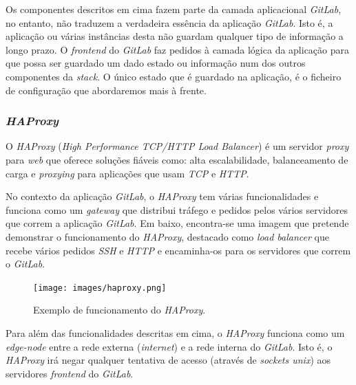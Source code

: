 \documentclass[12pt,a4paper]{article}
\begin{document}
Os componentes descritos em cima fazem parte da camada aplicacional \emph{GitLab}, no entanto, não traduzem a verdadeira essência da aplicação \emph{GitLab}. Isto é, a aplicação ou várias instâncias desta não guardam qualquer tipo de informação a longo prazo. O \emph{frontend} do \emph{GitLab} faz pedidos à camada lógica da aplicação para que possa ser guardado um dado estado ou informação num dos outros componentes da \emph{stack}. O único estado que é guardado na aplicação, é o ficheiro de configuração que abordaremos mais à frente.

\subsubsection{\emph{HAProxy}}


O \emph{HAProxy} (\emph{High Performance TCP/HTTP Load Balancer}) é um servidor \emph{proxy} para \emph{web} que oferece soluções fiáveis como: alta escalabilidade, balanceamento de carga e \emph{proxying} para aplicações que usam \emph{TCP} e \emph{HTTP}.

No contexto da aplicação \emph{GitLab}, o \emph{HAProxy} tem várias funcionalidades e funciona como um \emph{gateway} que distribui tráfego e pedidos pelos vários servidores que correm a aplicação \emph{GitLab}. Em baixo, encontra-se uma imagem que pretende demonstrar o funcionamento do \emph{HAProxy}, destacado como \emph{load balancer} que recebe vários pedidos \emph{SSH} e \emph{HTTP} e encaminha-os para os servidores que correm o \emph{GitLab}.

\begin{figure}[H]
  \centering
  \texttt{[image: images/haproxy.png]}
  \caption{Exemplo de funcionamento do \emph{HAProxy}.}
\end{figure}

Para além das funcionalidades descritas em cima, o \emph{HAProxy} funciona como um \emph{edge-node} entre a rede externa (\emph{internet}) e a rede interna do \emph{GitLab}. Isto é, o \emph{HAProxy} irá negar qualquer tentativa de acesso (através de \emph{sockets unix}) aos servidores \emph{frontend} do \emph{GitLab}.

\end{document}
